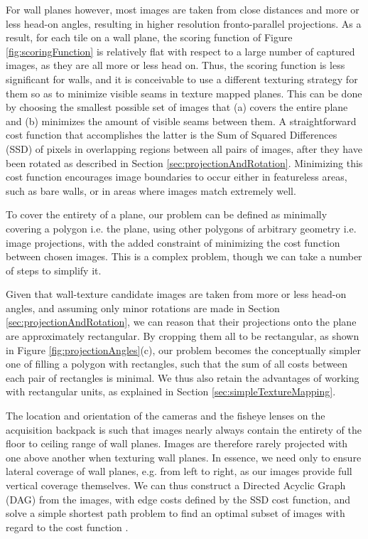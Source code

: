 \documentclass[10pt,twocolumn,letterpaper]{article}
\begin{document}
For wall planes however, most images are taken from close distances
and more or less head-on angles, resulting in higher resolution
fronto-parallel projections. As a result, for each tile on a wall
plane, the scoring function of Figure \ref{fig:scoringFunction} is
relatively flat with respect to a large number of captured images, as
they are all more or less head on. Thus, the scoring function is less
significant for walls, and it is conceivable to use a different
texturing strategy for them so as to minimize visible seams in texture
mapped planes. This can be done by choosing the smallest possible set
of images that (a) covers the entire plane and (b) minimizes the
amount of visible seams between them. A straightforward cost function
that accomplishes the latter is the Sum of Squared Differences (SSD)
of pixels in overlapping regions between all pairs of images, after
they have been rotated as described in Section
\ref{sec:projectionAndRotation}. Minimizing this cost function
encourages image boundaries to occur either in featureless areas, such
as bare walls, or in areas where images match extremely well.

To cover the entirety of a plane, our problem can be defined as
minimally covering a polygon i.e. the plane, using other polygons of
arbitrary geometry i.e. image projections, with the added constraint
of minimizing the cost function between chosen images.  This is a
complex problem, though we can take a number of steps to simplify it.

Given that wall-texture candidate images are taken from more or less
head-on angles, and assuming only minor rotations are made in Section
\ref{sec:projectionAndRotation}, we can reason that their projections
onto the plane are approximately rectangular. By cropping them all to
be rectangular, as shown in Figure \ref{fig:projectionAngles}(c), our
problem becomes the conceptually simpler one of filling a polygon with
rectangles, such that the sum of all costs between each pair of
rectangles is minimal. We thus also retain the advantages of working
with rectangular units, as explained in Section
\ref{sec:simpleTextureMapping}.

The location and orientation of the cameras and the fisheye lenses on
the acquisition backpack is such that images nearly always contain the
entirety of the floor to ceiling range of wall planes. Images are
therefore rarely projected with one above another when texturing wall
planes. In essence, we need only to ensure lateral coverage of wall
planes, e.g. from left to right, as our images provide full vertical
coverage themselves. We can thus construct a Directed Acyclic Graph
(DAG) from the images, with edge costs defined by the SSD cost
function, and solve a simple shortest path problem to find an optimal
subset of images with regard to the cost function \cite{dijkstra}.
\end{document}
